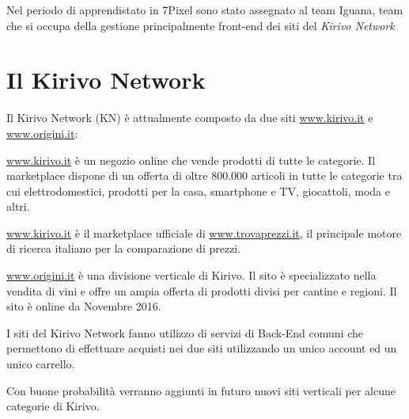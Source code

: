 


Nel periodo di apprendistato\cite{ETICHETTA} in 7Pixel sono stato assegnato al team Iguana, team che si occupa
della gestione principalmente front-end dei siti del \emph{Kirivo Network}

\section{Il Kirivo Network}
Il Kirivo Network (KN) è attualmente composto da due siti  \url{www.kirivo.it} 
e \url{www.origini.it}:

\url{www.kirivo.it} è un negozio online che vende prodotti di tutte le categorie.
Il marketplace dispone di un offerta di oltre 800.000 articoli in tutte le categorie tra cui
elettrodomestici, prodotti per la casa, smartphone e TV, giocattoli, moda e altri.

\url{www.kirivo.it} è il marketplace ufficiale di \url{www.trovaprezzi.it}, il principale motore
di ricerca italiano per la comparazione di prezzi.

\url{www.origini.it} è una divisione verticale di Kirivo. Il sito è specializzato nella vendita
di vini e offre un ampia offerta di prodotti divisi per cantine e regioni. Il sito
è online da Novembre 2016.

I siti del Kirivo Network fanno utilizzo di servizi di Back-End comuni che permettono 
di effettuare acquisti nei due siti utilizzando un unico account ed un unico carrello.

Con buone probabilità verranno aggiunti in futuro nuovi siti verticali per alcune categorie
di Kirivo.

